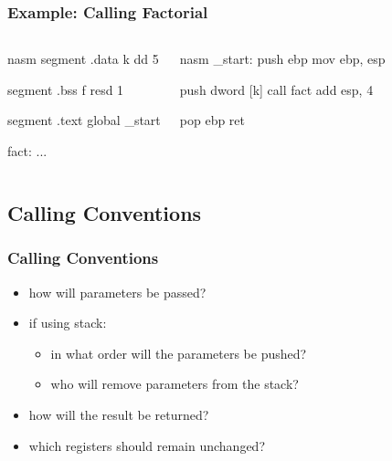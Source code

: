 \documentclass[dvipsnames]{beamer}
\begin{document}
\begin{frame}[fragile]
  \frametitle{Example: Calling Factorial}

  \begin{columns}[t]
    \begin{pygments}{nasm}
segment .data
k   dd   5

segment .bss
f   resd 1

segment .text
global _start

fact:
    ...
    \end{pygments}

    \begin{pygments}{nasm}
_start:
    push ebp
    mov  ebp, esp

    push dword [k]
    call fact
    add  esp, 4

    pop  ebp
    ret
    \end{pygments}
  \end{columns}
\end{frame}

\subsection{Calling Conventions}

\begin{frame}
  \frametitle{Calling Conventions}

  \begin{itemize}
    \item how will parameters be passed?
      \item if using stack:
      \begin{itemize}
        \item in what order will the parameters be pushed?
        \item who will remove parameters from the stack?
      \end{itemize}

    \item how will the result be returned?

    \item which registers should remain unchanged?
  \end{itemize}
\end{frame}
\end{document}
